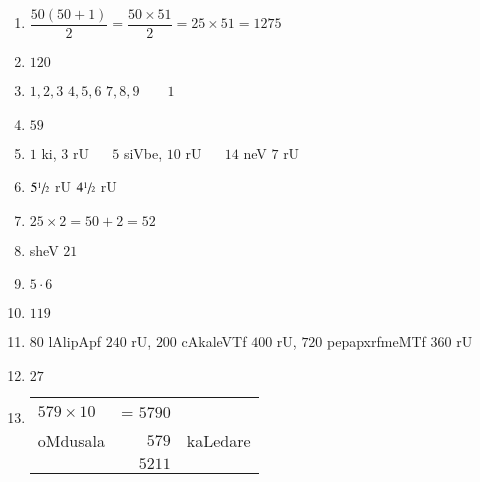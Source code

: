 \begin{enumerate}
\item $\dfrac{50(50+1)}{2} = \dfrac{50 \times 51}{2} = 25 \times 51 = 1275$
  
\item $120$

\item $1 , 2, 3$ \qquad $4,5,6$ \qquad $7 , 8,9 \qquad 1$

\item $59$

\item $1$ ki, $3$ rU ~~ $5$ siVbe, $10$ rU ~~ $14$ neV $7$ rU

\item $5 \sfrac{1}{2}$ rU $4\sfrac{1}{2}$ rU

\item $25 \times 2 = 50 +2 = 52$

\item sheV $21$

\item $5 \cdot 6$
  
\item $119$

\item $80$ lAlipApf $240$ rU, $200$ cAkaleVTf $400$ rU, $720$  pepapxrfmeMTf $360$ rU

\item $27$

\item
  \qquad \begin{tabular}[t]{lrl}
    $579 \times 10$ & = $5790$ & \\
    oMdusala & $579$ & kaLedare \\\cline{2-2}
    & $5211$ &
  \end{tabular}

\end{enumerate}
